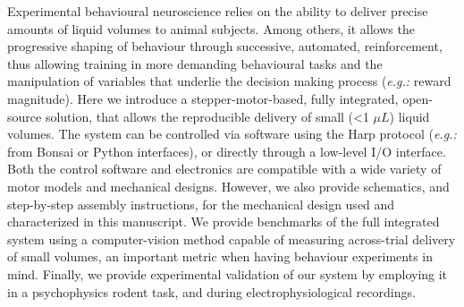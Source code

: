 Experimental behavioural neuroscience relies on the ability to deliver precise amounts of liquid volumes to animal subjects. Among others, it allows the progressive shaping of behaviour through successive, automated, reinforcement, thus allowing training in more demanding behavioural tasks and the manipulation of variables that underlie the decision making process (\textit{e.g.:} reward magnitude).
Here we introduce a stepper-motor-based, fully integrated, open-source solution, that allows the reproducible delivery of small (<1 $\mu L$) liquid volumes.
The system can be controlled via software using the Harp protocol (\textit{e.g.:} from Bonsai or Python interfaces), or directly through a low-level I/O interface. Both the control software and electronics are compatible with a wide variety of motor models and mechanical designs. However, we also provide schematics, and step-by-step assembly instructions, for the mechanical design used and characterized in this manuscript.
We provide benchmarks of the full integrated system using a computer-vision method capable of measuring across-trial delivery of small volumes, an important metric when having behaviour experiments in mind. Finally, we provide experimental validation of our system by employing it in a psychophysics rodent task, and during electrophysiological recordings.
